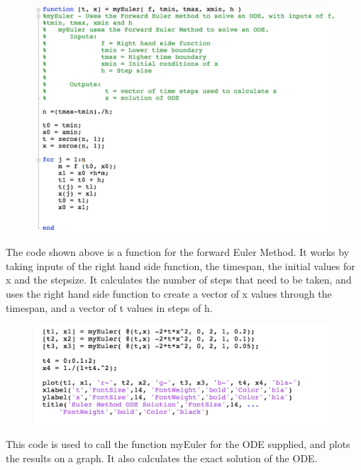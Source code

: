 \documentclass[a4paper]{article}
\begin{document}
\begin{figure}[H]
\includegraphics[width=1\textwidth]{myeuler.jpg}
\end{figure}
The code shown above is a function for the forward Euler Method. It works by taking inputs of the right hand side function, the timespan, the initial values for x and the stepsize. It calculates the number of steps that need to be taken, and uses the right hand side function to create a vector of x values through the timespan, and a vector of t values in steps of h. 

\begin{figure}[H]
\includegraphics[width=1\textwidth]{question1ai.jpg}
\end{figure}

This code is used to call the function myEuler for the ODE supplied, and plots the results on a graph. It also calculates the exact solution of the ODE. 
\end{document}
